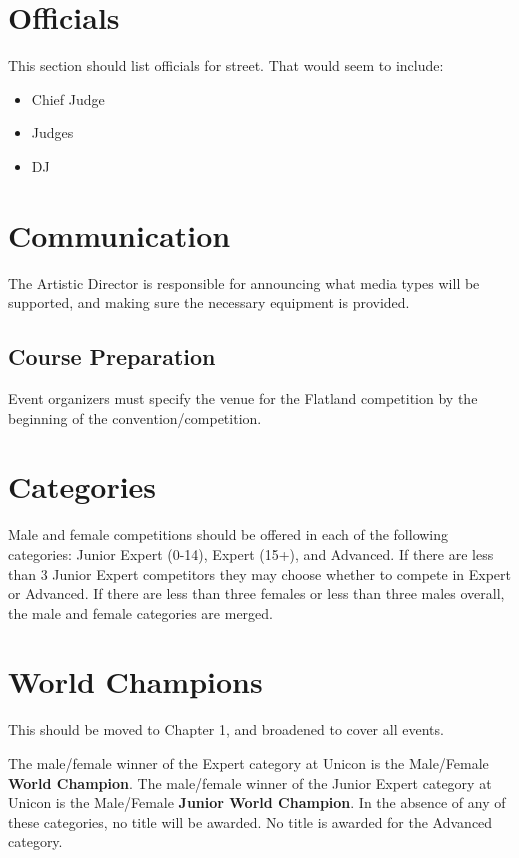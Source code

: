 \section{Officials}

\begin{framed}
This section should list officials for street.  That would seem to include:
\begin{itemize}
\item Chief Judge
\item Judges
\item DJ
\end{itemize}
\end{framed}

\section{Communication}

The Artistic Director is responsible for announcing what media types will be supported, and making sure the necessary equipment is provided.

\subsection{Course Preparation}

Event organizers must specify the venue for the Flatland competition by the beginning of the convention/competition.

\section{Categories}
Male and female competitions should be offered in each of the following categories: Junior Expert (0-14), Expert (15+), and Advanced.
If there are less than 3 Junior Expert competitors they may choose whether to compete in Expert or Advanced.
If there are less than three females or less than three males overall, the male and female categories are merged.

\section{World Champions}

\begin{framed}
This should be moved to Chapter 1, and broadened to cover all events.
\end{framed}

The male/female winner of the Expert category at Unicon is the Male/Female \textbf{World Champion}.
The male/female winner of the Junior Expert category at Unicon is the Male/Female \textbf{Junior World Champion}.
In the absence of any of these categories, no title will be awarded.
No title is awarded for the Advanced category.

